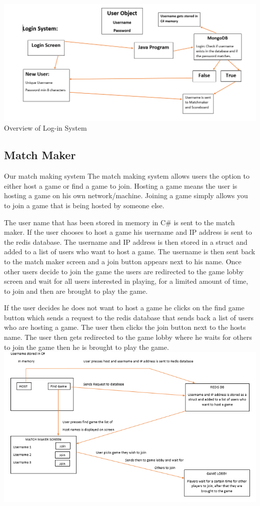 \includegraphics[width=1\columnwidth]{img/LoginSystem.PNG}
Overview of Log-in System

\subsection {Match Maker}\newline
Our match making system
The match making system allows users the option to either host a game or find a game to join. Hosting a game means the user is hosting a game on his own network/machine. Joining a game simply allows you to join a game that is being hosted by someone else.\newline

The user name that has been stored in memory in C\# is sent to the match maker. If the user chooses to host a game his username and IP address is sent to the redis database. The username and IP address is then stored in a struct and added to a list of users who want to host a game. The username is then sent back to the match maker screen and a join button appears next to his name. Once other users decide to join the game the users are redirected to the game lobby screen and wait for all users interested in playing, for a limited amount of time, to join and then are brought to play the game.\newline

If the user decides he does not want to host a game he clicks on the find game button which sends a request to the redis database that sends back a list of users who are hosting a game. The user then clicks the join button next to the hosts name. The user then gets redirected to the game lobby where he waits for others to join the game then he is brought to play the game. 
\includegraphics[width=1\columnwidth]{img/redisMatch.PNG}

